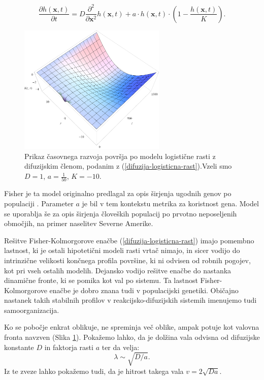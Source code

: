 \documentclass[a4paper, twoside, 12pt]{book}
\begin{document}
    \begin{equation}
      \frac{ \partial h(\mathbf{x},t) }{ \partial t} = D \frac{\partial^2}{\partial \mathbf{x}^2} h(\mathbf{x},t) + a \cdot h(\mathbf{x},t) \cdot (1 - \frac{h(\mathbf{x},t)}{K}).
      \label{difuzija-logisticna-rast}
    \end{equation}
    \begin{figure}[h!]
      \begin{center}
        \includegraphics[width=7cm]{slike/difuzija-logisticna-rast2}
      \end{center}
      \caption{Prikaz časovnega razvoja površja po modelu logistične rasti z difuzijskim členom, podanim z (\ref{difuzija-logisticna-rast}).Vzeli smo $D=1$, $a=\frac{1}{50}$, $K=-10$.}
      \label{fig:difuzija-logisticna-rast}
    \end{figure}

Fisher je ta model originalno predlagal za opis širjenja ugodnih genov po populaciji \cite{broadbridge2002huxley}. Parameter $a$ je bil v tem kontekstu metrika za koristnost gena. Model se uporablja še za opis širjenja človeških populacij po prvotno neposeljenih območjih, na primer naselitev Severne Amerike.

Rešitve Fisher-Kolmorgorove enačbe (\ref{difuzija-logisticna-rast}) imajo pomembno lastnost, ki je ostali hipotetični modeli rasti vrtač nimajo, in sicer vodijo do intrinzične velikosti končnega profila površine, ki ni odvisen od robnih pogojev, kot pri vseh ostalih modelih. Dejansko vodijo rešitve enačbe do nastanka dinamične fronte, ki se pomika kot val po sistemu. Ta lastnost Fisher-Kolmorgorove enačbe je dobro znana tudi v populacijski genetiki. Običajno nastanek takih stabilnih profilov v reakcijsko-difuzijskih sistemih imenujemo tudi samoorganizacija.

Ko se pobočje enkrat oblikuje, ne spreminja več oblike, ampak potuje kot valovna fronta navzven (Slika \ref{fig:difuzija-logisticna-rast}). Pokažemo lahko, da je dolžina vala odvisna od difuzijske konstante $D$ in faktorja rasti $a$ ter da velja: 
    \[ \lambda \sim \sqrt{D/a}. \]
Iz te zveze lahko pokažemo tudi, da je hitrost takega vala $v = 2 \sqrt{D a}$.
\end{document}
